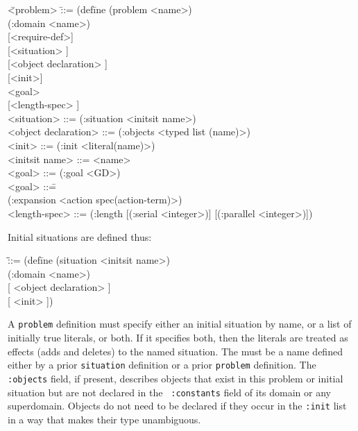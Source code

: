 \begin{nopagebreak}\begin{tabtt}
\bump\=<problem> \bump\bump \=::= (def\=ine (problem <name>) \+\+\+\\
                                      (:domain <name>) \\
                                      {[}<require-def>] \\
                                      {[}<situation> ] \\
                                      {[}<object declaration> ] \\
                                      {[}<init>] \\
                                      <goal>\oom \\
                                      {[}<length-spec> ]\-\-\\
   <situation> \> ::= (:situation <initsit name>) \\
   <object declaration> ::= (:objects <typed list (name)>) \\
   <init> \> ::= (:init <literal(name)>\oom) \\
   <initsit name> \>::= <name> \\
   <goal> \> ::= (:goal <GD>) \\
\smallskip
   <goal> \>::=\= \\
               \>\>\bump(:expansion <action spec(action-term)>) \\
   <length-spec> \>::= (:length [(:serial <integer>)] [(:parallel <integer>)])
\end{tabtt}
\end{nopagebreak}

Initial situations are defined thus:
\begin{tabtt}
\bump\=<initsit def> \=::= (def\=ine (situation <initsit name>) \+\+\+\\
                              (:domain <name>) \\
                              {[} <object declaration> ] \\
                              {[} <init> ])
\end{tabtt}

A {\tt problem} definition must specify either an initial situation by
name, or a list of initially true literals, or both.  If it specifies
both, then the literals are treated as effects (adds and deletes) to
the named situation.  The {\tt <initsit name>} must be a name defined
either by a prior {\tt situation} definition or a prior {\tt problem}
definition. 
The {\tt :objects} field, if present, describes
objects that exist in this problem or initial situation
but are not declared in the {\tt
:constants} field of its domain or any superdomain.  Objects do not
need to be declared if they occur in the {\tt :init} list in a way
that makes their type unambiguous.

